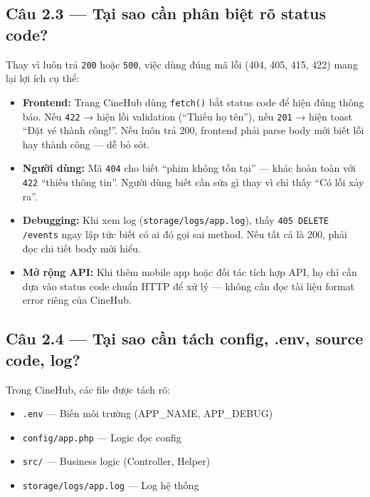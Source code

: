 \documentclass[12pt,a4paper]{article}
\begin{document}
\newpage

\subsection{Câu 2.3 — Tại sao cần phân biệt rõ status code?}

Thay vì luôn trả \texttt{200} hoặc \texttt{500}, việc dùng đúng mã lỗi (404, 405, 415, 422) mang lại lợi ích cụ thể:

\begin{itemize}
    \item \textbf{Frontend:} Trang CineHub dùng \texttt{fetch()} bắt status code để hiện đúng thông báo. Nếu \texttt{422} → hiện lỗi validation (``Thiếu họ tên''), nếu \texttt{201} → hiện toast ``Đặt vé thành công!''. Nếu luôn trả 200, frontend phải parse body mới biết lỗi hay thành công — dễ bỏ sót.

    \item \textbf{Người dùng:} Mã \texttt{404} cho biết ``phim không tồn tại'' — khác hoàn toàn với \texttt{422} ``thiếu thông tin''. Người dùng biết cần sửa gì thay vì chỉ thấy ``Có lỗi xảy ra''.

    \item \textbf{Debugging:} Khi xem log (\texttt{storage/logs/app.log}), thấy \texttt{405 DELETE /events} ngay lập tức biết có ai đó gọi sai method. Nếu tất cả là 200, phải đọc chi tiết body mới hiểu.

    \item \textbf{Mở rộng API:} Khi thêm mobile app hoặc đối tác tích hợp API, họ chỉ cần dựa vào status code chuẩn HTTP để xử lý — không cần đọc tài liệu format error riêng của CineHub.
\end{itemize}

\subsection{Câu 2.4 — Tại sao cần tách config, .env, source code, log?}

Trong CineHub, các file được tách rõ:
\begin{itemize}[noitemsep]
    \item \texttt{.env} — Biến môi trường (APP\_NAME, APP\_DEBUG)
    \item \texttt{config/app.php} — Logic đọc config
    \item \texttt{src/} — Business logic (Controller, Helper)
    \item \texttt{storage/logs/app.log} — Log hệ thống
\end{itemize}
\end{document}
